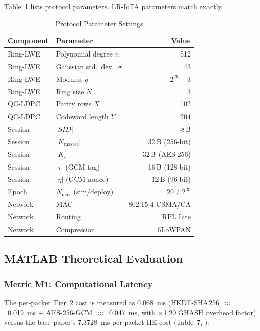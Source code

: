 \documentclass[conference]{IEEEtran}
\newcommand{\Kmaster}{K_{\mathrm{master}}}
\newcommand{\Nmax}{N_{\max}}
\newcommand{\SID}{\mathit{SID}}
\begin{document}
Table~\ref{tab:params} lists protocol parameters. LR-IoTA parameters
match \cite{kumari2022} exactly.

\begin{table}[t]
\centering
\caption{Protocol Parameter Settings}
\label{tab:params}
\renewcommand{\arraystretch}{1.1}
\begin{tabular}{llr}
\toprule
\textbf{Component} & \textbf{Parameter} & \textbf{Value} \\
\midrule
Ring-LWE & Polynomial degree $n$ & 512 \\
Ring-LWE & Gaussian std.\ dev.\ $\sigma$ & 43 \\
Ring-LWE & Modulus $q$ & $2^{29}{-}3$ \\
Ring-LWE & Ring size $N$ & 3 \\
QC-LDPC & Parity rows $X$ & 102 \\
QC-LDPC & Codeword length $Y$ & 204 \\
Session & $|\SID|$ & 8\,B \\
Session & $|\Kmaster|$ & 32\,B (256-bit) \\
Session & $|K_i|$ & 32\,B (AES-256) \\
Session & $|\tau|$ (GCM tag) & 16\,B (128-bit) \\
Session & $|\eta|$ (GCM nonce) & 12\,B (96-bit) \\
Epoch & $\Nmax$ (sim/deploy) & 20 / $2^{20}$ \\
Network & MAC & 802.15.4 CSMA/CA \\
Network & Routing & RPL Lite \\
Network & Compression & 6LoWPAN \\
\bottomrule
\end{tabular}
\end{table}

\subsection{MATLAB Theoretical Evaluation}

\subsubsection{Metric M1: Computational Latency}

The per-packet Tier~2 cost is measured as 0.068~ms
(HKDF-SHA256~$\approx$~0.019~ms + AES-256-GCM~$\approx$~0.047~ms,
with $\times$1.20 GHASH overhead factor) versus the base paper's
7.3728~ms per-packet HE cost (Table~7, \cite{kumari2022}):
\end{document}
